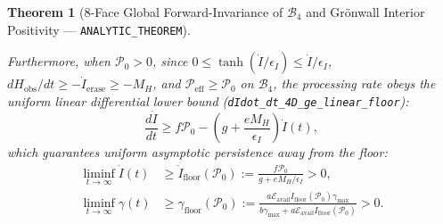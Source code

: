 \documentclass[11pt,a4paper]{article}
\newtheorem{theorem}{Theorem}
\theoremstyle{definition}
\begin{document}
\begin{theorem}[8-Face Global Forward-Invariance of $\mathcal{B}_4$ and Gr\"onwall Interior Positivity --- \texttt{ANALYTIC\_THEOREM}]
\begin{enumerate}
\begin{equation}
  \end{equation}
  Furthermore, when $\mathcal{P}_0 > 0$, since $0 \le \tanh(\dot{I}/\epsilon_I) \le \dot{I}/\epsilon_I$, $dH_{\mathrm{obs}}/dt \ge -\dot{I}_{\mathrm{erase}} \ge -M_H$, and $\mathcal{P}_{\mathrm{eff}} \ge \mathcal{P}_0$ on $\mathcal{B}_4$, the processing rate obeys the uniform linear differential lower bound (\texttt{dIdot\_dt\_4D\_ge\_linear\_floor}):
  \begin{equation}
  \label{eq:Idot_linear_floor}
  \frac{d\dot{I}}{dt} \ge f\mathcal{P}_0 - \left(g + \frac{e M_H}{\epsilon_I}\right)\dot{I}(t),
  \end{equation}
  which guarantees uniform asymptotic persistence away from the floor:
  \begin{equation}
  \label{eq:liminf_floors}
  \begin{aligned}
  \liminf_{t\to\infty}\dot{I}(t) &\ge \dot{I}_{\mathrm{floor}}(\mathcal{P}_0) := \frac{f\mathcal{P}_0}{g + e M_H/\epsilon_I} > 0, \\
  \liminf_{t\to\infty}\gamma(t) &\ge \gamma_{\mathrm{floor}}(\mathcal{P}_0) := \frac{a\mathcal{E}_{\mathrm{avail}}\dot{I}_{\mathrm{floor}}(\mathcal{P}_0)\gamma_{\max}}{b\gamma_{\max} + a\mathcal{E}_{\mathrm{avail}}\dot{I}_{\mathrm{floor}}(\mathcal{P}_0)} > 0.
  \end{aligned}
  \end{equation}
\end{enumerate}
\end{theorem}
\end{document}
